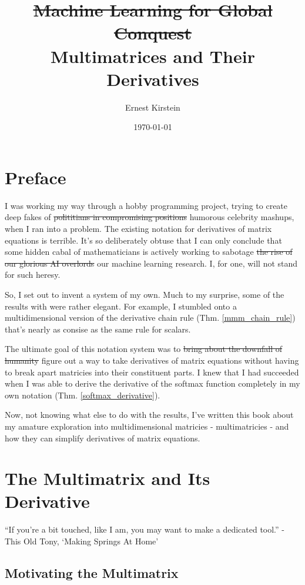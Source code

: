 \documentclass[12pt]{book}
\title{%
  \sout{Machine Learning for Global Conquest} \\
  Multimatrices and Their Derivatives}
\author{Ernest Kirstein}
\date{\today}
\theoremstyle{plain}
\theoremstyle{definition}
\theoremstyle{ppart}
\theoremstyle{case}
\theoremstyle{solution}
\begin{document}
\maketitle

\chapter*{Preface}
I was working my way through a hobby programming project, trying to create deep fakes of
\sout{polititians in compromising positions} humorous celebrity mashups, when I ran into a problem.
The existing notation for derivatives of matrix equations is terrible.
It's so deliberately obtuse that I can only conclude that some hidden cabal of
mathematicians is actively working to sabotage \sout{the rise of our glorious AI overlords}
our machine learning research.
I, for one, will not stand for such heresy.

So, I set out to invent a system of my own. Much to my surprise, some of the
results with were rather elegant. For example, I stumbled onto a
multidimensional version of the derivative chain rule (Thm. \ref{mmm_chain_rule})
that's nearly as consise as the same rule for scalars.

The ultimate goal of this notation system was to \sout{bring about the downfall
of humanity} figure out a way to take derivatives
of matrix equations without having to break apart matricies into their constituent
parts. I knew that I had succeeded when I was able to derive the derivative of the
softmax function completely in my own notation (Thm. \ref{softmax_derivative}).

Now, not knowing what else to do with the results, I've written this book
about my amature exploration into multidimensional matricies -
multimatricies - and how they can simplify derivatives of matrix equations.

\tableofcontents

\chapter{The Multimatrix and Its Derivative}

\begin{displayquote}
``If you're a bit touched, like I am, you may want to make a dedicated tool.'' -
This Old Tony, `Making Springs At Home' \cite{youtube:tony}
\end{displayquote}

\section{Motivating the Multimatrix}
\end{document}
